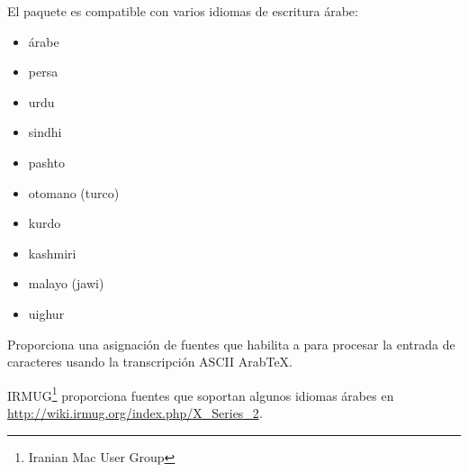 El paquete \cite{arabxetex} es compatible con varios idiomas de
escritura árabe:

\begin{itemize}
\item árabe
\item persa
\item urdu
\item sindhi
\item pashto
\item otomano (turco)
\item kurdo
\item kashmiri
\item malayo (jawi)
\item uighur
\end{itemize}

Proporciona una asignación de fuentes que habilita a  para 
procesar la entrada de caracteres usando la transcripción ASCII Arab\TeX.

IRMUG\footnote{Iranian Mac User Group} proporciona fuentes que soportan algunos
idiomas árabes en \url{http://wiki.irmug.org/index.php/X_Series_2}.

